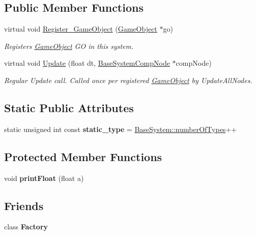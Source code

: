 \subsection*{Public Member Functions}
\begin{DoxyCompactItemize}
\item 
virtual void \hyperlink{classTestSystem_a73b7677422d0b780cca6ec9e7b31d653}{Register\+\_\+\+Game\+Object} (\hyperlink{classGameObject}{Game\+Object} $\ast$go)
\begin{DoxyCompactList}\small\item\em Registers \hyperlink{classGameObject}{Game\+Object} GO in this system. \end{DoxyCompactList}\item 
virtual void \hyperlink{classTestSystem_a3742fdf321596824bc2aac8a91a3ddb0}{Update} (float dt, \hyperlink{structBaseSystemCompNode}{Base\+System\+Comp\+Node} $\ast$comp\+Node)
\begin{DoxyCompactList}\small\item\em Regular Update call. Called once per registered \hyperlink{classGameObject}{Game\+Object} by Update\+All\+Nodes. \end{DoxyCompactList}\end{DoxyCompactItemize}
\subsection*{Static Public Attributes}
\begin{DoxyCompactItemize}
\item 
\mbox{\label{classTestSystem_a2557cacb59b1a2192396bf39bf191df5}} 
static unsigned int const {\bfseries static\+\_\+type} = \hyperlink{classBaseSystem_a7ef356edab3cfb02905e0a73a645b131}{Base\+System\+::number\+Of\+Types}++
\end{DoxyCompactItemize}
\subsection*{Protected Member Functions}
\begin{DoxyCompactItemize}
\item 
\mbox{\label{classTestSystem_a7e9753ae789d2e9a57e428b1c34a7075}} 
void {\bfseries print\+Float} (float a)
\end{DoxyCompactItemize}
\subsection*{Friends}
\begin{DoxyCompactItemize}
\item 
\mbox{\label{classTestSystem_a328c093d609680cca505905c6d49901a}} 
class {\bfseries Factory}
\end{DoxyCompactItemize}
